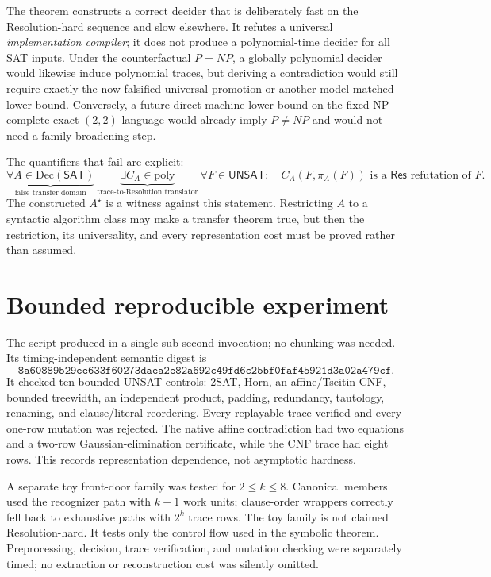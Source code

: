 \documentclass[11pt]{article}
\newcommand{\SAT}{\mathsf{SAT}}
\newcommand{\UNSAT}{\mathsf{UNSAT}}
\newcommand{\Res}{\mathsf{Res}}
\begin{document}
The theorem constructs a correct decider that is deliberately fast on the
Resolution-hard sequence and slow elsewhere.  It refutes a universal
\emph{implementation compiler}; it does not produce a polynomial-time decider
for all SAT inputs.  Under the counterfactual $P=NP$, a globally polynomial
decider would likewise induce polynomial traces, but deriving a contradiction
would still require exactly the now-falsified universal promotion or another
model-matched lower bound.  Conversely, a future direct machine lower bound on
the fixed NP-complete exact-$(2,2)$ language would already imply $P\ne NP$ and
would not need a family-broadening step.

The quantifiers that fail are explicit:
\[
 \underbrace{\forall A\in\mathrm{Dec}(\SAT)}_{\text{false transfer domain}}
 \ \underbrace{\exists C_A\in\mathrm{poly}}_{\text{trace-to-Resolution translator}}
 \ \forall F\in\UNSAT:\quad
 C_A(F,\pi_A(F))\text{ is a }\Res\text{ refutation of }F.
\]
The constructed $A^\star$ is a witness against this statement.  Restricting
$A$ to a syntactic algorithm class may make a transfer theorem true, but then
the restriction, its universality, and every representation cost must be
proved rather than assumed.

\section{Bounded reproducible experiment}

The script
 produced
 in a
single sub-second invocation; no chunking was needed.  Its timing-independent
semantic digest is
\[
\texttt{8a60889529ee633f60273daea2e82a692c49fd6c25bf0faf45921d3a02a479cf}.
\]
It checked ten bounded UNSAT controls: 2SAT, Horn, an affine/Tseitin CNF,
bounded treewidth, an independent product, padding, redundancy, tautology,
renaming, and clause/literal reordering.  Every replayable trace verified and
every one-row mutation was rejected.  The native affine contradiction had two
equations and a two-row Gaussian-elimination certificate, while the CNF trace
had eight rows.  This records representation dependence, not asymptotic
hardness.

A separate toy front-door family was tested for $2\le k\le8$.  Canonical
members used the recognizer path with $k-1$ work units; clause-order wrappers
correctly fell back to exhaustive paths with $2^k$ trace rows.  The toy family
is not claimed Resolution-hard.  It tests only the control flow used in the
symbolic theorem.  Preprocessing, decision, trace verification, and mutation
checking were separately timed; no extraction or reconstruction cost was
silently omitted.
\end{document}
